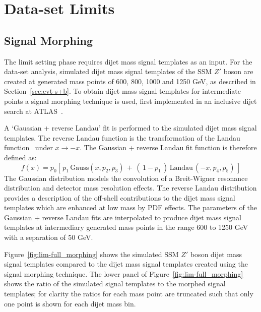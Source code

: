 \vfill
\clearpage

\section{\lm{} Data-set Limits}
\label{sec:lim-full}

\subsection{Signal Morphing}
\label{sec:lim-full_morphing}

The limit setting phase requires dijet mass signal templates as an input.
For the \lm{} data-set analysis, simulated dijet mass signal templates of the SSM $Z'$ boson are created at generated mass points of
600, 800, 1000 and 1250 GeV, as described in Section~\ref{sec:evt-s+b}.
To obtain dijet mass signal templates for intermediate points a signal morphing technique is used,
first implemented in an inclusive dijet search at ATLAS~\cite{dijet-mori17_paper}.

A `Gaussian + reverse Landau' fit is performed to the simulated dijet mass signal templates.
The reverse Landau function is the transformation of the Landau function~\cite{lim-landau} under $x\to-x$.
The Gaussian + reverse Landau fit function is therefore defined as:
\begin{equation}
  f(x)=p_0 \left[ \,p_1\,\mathrm{Gauss}\left(x,p_2,p_3\right)\,+\,\left(\,1-p_1\,\right)\,\mathrm{Landau}\,\left(-x,p_4,p_5\right)\, \right]
\end{equation}
The Gaussian distribution models the convolution of a Breit-Wigner resonance distribution and detector mass resolution effects.
The reverse Landau distribution provides a description of the off-shell contributions to the dijet mass signal templates which are enhanced at low mass by PDF effects.
The parameters of the Gaussian + reverse Landau fits are interpolated to produce dijet mass signal templates at intermediary generated mass points
in the range 600 to 1250 GeV with a separation of 50 GeV.

Figure~\ref{fig:lim-full_morphing} shows the simulated SSM $Z'$ boson dijet mass signal templates
compared to the dijet mass signal templates created using the signal morphing technique.
The lower panel of Figure~\ref{fig:lim-full_morphing} shows the ratio of the simulated signal templates to the morphed signal templates;
for clarity the ratios for each mass point are truncated such that only one point is shown for each dijet mass bin.

